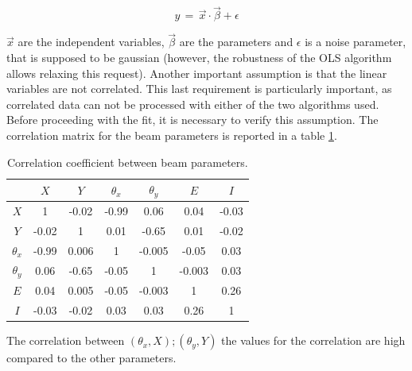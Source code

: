\begin{equation}
 y \, = \, \vec{x} \cdot \vec{\beta} + \epsilon
\end{equation}

$\vec{x}$ are the independent variables, $\vec{\beta}$ are the parameters and $\epsilon$ is a noise parameter, that is supposed to be gaussian (however, the robustness of the OLS algorithm allows relaxing this request). Another important assumption is that the linear variables are not correlated. 
This last requirement is particularly important, as correlated data can not be processed with either of the two algorithms used. Before proceeding with the fit, it is necessary to verify this assumption. The correlation matrix for the beam parameters is reported in a table \ref{tab:CorrMatrix}.

\begin{table}[!ht]
\centering
\begin{tabular}{c|cccccc}
\hline 
             & $X$ & $Y$ & $\theta_{x}$ & $\theta_{y}$ & $E$ & $I$\\ 
\hline 
$X$            & 1 & -0.02 & -0.99 & 0.06 & 0.04  & -0.03\\ 

$Y$            & -0.02 & 1 & 0.01 & -0.65 & 0.01  & -0.02\\ 

$\theta_{x}$ & -0.99 & 0.006 & 1  & -0.005 & -0.05 & 0.03\\ 

$\theta_{y}$ & 0.06 & -0.65 & -0.05 & 1 & -0.003  & 0.03\\ 
 
$E$            & 0.04 & 0.005 & -0.05  & -0.003  & 1 & 0.26\\ 
 
$I$            & -0.03 & -0.02 & 0.03  & 0.03 & 0.26 & 1\\ 
\hline
\end{tabular}
\caption{Correlation coefficient between beam parameters.}
\label{tab:CorrMatrix} 
\end{table}

The correlation between $(\theta_{x},X);(\theta_{y},Y)$ the values for the correlation are high compared to the other parameters. 

